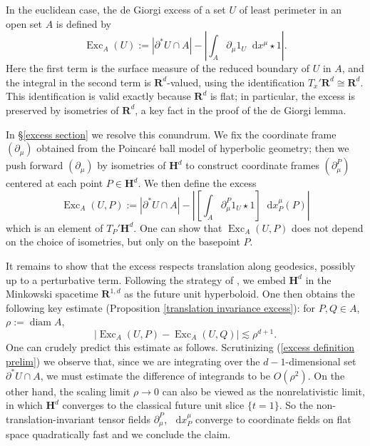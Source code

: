 \documentclass[reqno,11pt]{amsart}
\newcommand{\RR}{\mathbf{R}}
\newcommand{\Hyp}{\mathbf H}
\DeclareMathOperator{\diam}{diam}
\DeclareMathOperator{\Exc}{Exc}
\newcommand*\dif{\mathop{}\!\mathrm{d}}
\theoremstyle{definition}
\numberwithin{equation}{section}
\begin{document}
In the euclidean case, the de Giorgi excess of a set $U$ of least perimeter in an open set $A$ is defined by
$$\Exc_A(U) := |\partial^* U \cap A| - \left|\int_A \partial_\mu 1_U \dif x^\mu \star 1\right|.$$
Here the first term is the surface measure of the reduced boundary of $U$ in $A$, and the integral in the second term is $\RR^d$-valued, using the identification $T_x'\RR^d \cong \RR^d$.
This identification is valid exactly because $\RR^d$ is flat; in particular, the excess is preserved by isometries of $\RR^d$, a key fact in the proof of the de Giorgi lemma.

In \S\ref{excess section} we resolve this conundrum.
We fix the coordinate frame $(\partial_\mu)$ obtained from the Poincar\'e ball model of hyperbolic geometry; then we push forward $(\partial_\mu)$ by isometries of $\Hyp^d$ to construct coordinate frames $(\partial_\mu^P)$ centered at each point $P \in \Hyp^d$.
We then define the excess
\begin{equation}\label{excess definition prelim}
\Exc_A(U, P) := |\partial^* U \cap A| - \left|\left[\int_A \partial_\mu^P 1_U \star 1\right] \dif x^\mu_P(P)\right|
\end{equation}
which is an element of $T_P' \Hyp^d$.
One can show that $\Exc_A(U, P)$ does not depend on the choice of isometries, but only on the basepoint $P$.

It remains to show that the excess respects translation along geodesics, possibly up to a perturbative term.
Following the strategy of \cite{daskalopoulosPrep1}, we embed $\Hyp^d$ in the Minkowski spacetime $\RR^{1, d}$ as the future unit hyperboloid.
One then obtains the following key estimate (Proposition \ref{translation invariance excess}): for $P, Q \in A$, $\rho := \diam A$,
\begin{equation}\label{almost translation invariance intro}
|\Exc_A(U, P) - \Exc_A(U, Q)| \lesssim \rho^{d + 1}.
\end{equation}
One can crudely predict this estimate as follows.
Scrutinizing (\ref{excess definition prelim}) we observe that, since we are integrating over the $d-1$-dimensional set $\partial^* U \cap A$, we must estimate the difference of integrands to be $O(\rho^2)$.
On the other hand, the scaling limit $\rho \to 0$ can also be viewed as the nonrelativistic limit, in which $\Hyp^d$ converges to the classical future unit slice $\{t = 1\}$.
So the non-translation-invariant tensor fields $\partial_\mu^P$, $\dif x^\mu_P$ converge to coordinate fields on flat space quadratically fast and we conclude the claim.
\end{document}
